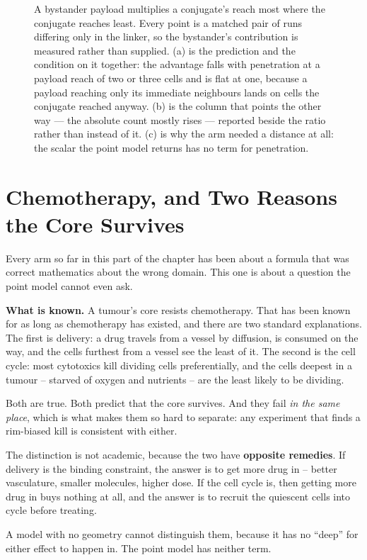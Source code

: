 \documentclass[11pt,twoside,openright]{report}
\begin{document}
\begin{figure}[tbp]
\setcounter{figure}{42}
\caption{A bystander payload multiplies a conjugate's reach most where the conjugate reaches least. Every point is a matched pair of runs differing only in the linker, so the bystander's contribution is measured rather than supplied. (a) is the prediction and the condition on it together: the advantage falls with penetration at a payload reach of two or three cells and is flat at one, because a payload reaching only its immediate neighbours lands on cells the conjugate reached anyway. (b) is the column that points the other way --- the absolute count mostly rises --- reported beside the ratio rather than instead of it. (c) is why the arm needed a distance at all: the scalar the point model returns has no term for penetration.}
\label{fig:fig47_adc_bystander_reach}
\end{figure}

\section{Chemotherapy, and Two Reasons the Core Survives}

Every arm so far in this part of the chapter has been about a formula that was correct mathematics about the wrong domain. This one is about a question the point model cannot even ask.

\textbf{What is known.} A tumour's core resists chemotherapy. That has been known for as long as chemotherapy has existed, and there are two standard explanations. The first is delivery: a drug travels from a vessel by diffusion, is consumed on the way, and the cells furthest from a vessel see the least of it. The second is the cell cycle: most cytotoxics kill dividing cells preferentially, and the cells deepest in a tumour -- starved of oxygen and nutrients -- are the least likely to be dividing.

Both are true. Both predict that the core survives. And they fail \textit{in the same place}, which is what makes them so hard to separate: any experiment that finds a rim-biased kill is consistent with either.

\begin{finding}
The distinction is not academic, because the two have \textbf{opposite remedies}. If delivery is the binding constraint, the answer is to get more drug in -- better vasculature, smaller molecules, higher dose. If the cell cycle is, then getting more drug in buys nothing at all, and the answer is to recruit the quiescent cells into cycle before treating.

A model with no geometry cannot distinguish them, because it has no ``deep'' for either effect to happen in. The point model has neither term.
\end{finding}
\end{document}
